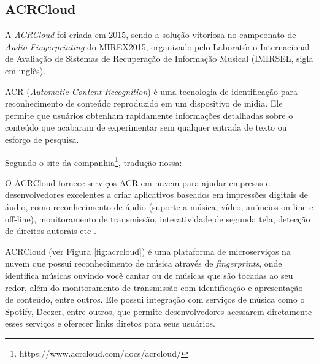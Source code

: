 \subsection{ACRCloud} \label{subsec:acrcloud} %
A \textit{ACRCloud} foi criada em 2015, sendo a solução vitoriosa no campeonato de \textit{Audio Fingerprinting} do MIREX2015, organizado pelo Laboratório Internacional de Avaliação de Sistemas de Recuperação de Informação Musical (IMIRSEL, sigla em inglês).

ACR (\textit{Automatic Content Recognition}) é uma tecnologia de identificação para reconhecimento de conteúdo reproduzido em um dispositivo de mídia. Ele permite que usuários obtenham rapidamente informações detalhadas sobre o conteúdo que acabaram de experimentar sem qualquer entrada de texto ou esforço de pesquisa.

Segundo o site da companhia\footnote{https://www.acrcloud.com/docs/acrcloud/}, tradução nossa:

\begin{citacao}
O ACRCloud fornece serviços ACR em nuvem para ajudar empresas e desenvolvedores excelentes a criar aplicativos baseados em impressões digitais de áudio, como reconhecimento de áudio (suporte a música, vídeo, anúncios on-line e off-line), monitoramento de transmissão, interatividade de segunda tela, detecção de direitos autorais etc \cite{acrcloud2015}.
\end{citacao}

ACRCloud (ver Figura \ref{fig:acrcloud}) é uma plataforma de microserviços na nuvem que possui reconhecimento de música através de \textit{fingerprints}, onde identifica músicas ouvindo você cantar ou de músicas que são tocadas ao seu redor, além do monitoramento de transmissão com identificação e apresentação de conteúdo, entre outros. Ele possui integração com serviços de música como o Spotify, Deezer, entre outros, que permite desenvolvedores acessarem diretamente esses serviços e oferecer links diretos para seus usuários.

